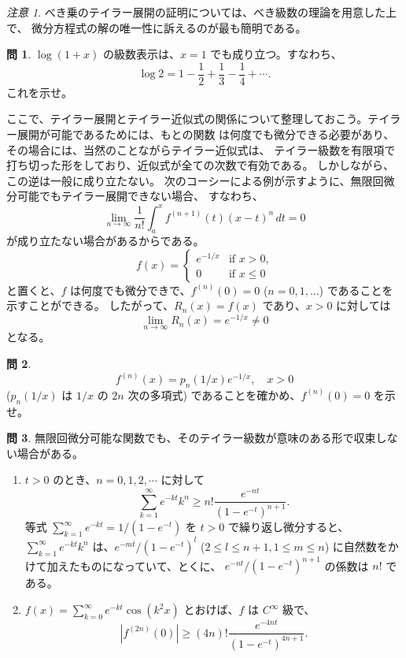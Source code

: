 \documentclass[a4paper]{jsarticle}
\theoremstyle{definition}
\newtheorem{Exercise}{問}%
\theoremstyle{remark}
\newtheorem{Remark}{注意}
\begin{document}
\begin{Remark}
{\small
べき乗のテイラー展開の証明については、べき級数の理論を用意した上で、
微分方程式の解の唯一性に訴えるのが最も簡明である。}
\end{Remark}

\begin{Exercise} $\log(1+x)$ の級数表示は、$x=1$ でも成り立つ。すなわち、
\[ 
\log 2 = 1 - \frac{1}{2} + \frac{1}{3} - \frac{1}{4} + \cdots.  
\]
これを示せ。
\end{Exercise} 

ここで、テイラー展開とテイラー近似式の関係について整理しておこう。テイラー展開が可能であるためには、もとの関数
は何度でも微分できる必要があり、その場合には、当然のことながらテイラー近似式は、
テイラー級数を有限項で打ち切った形をしており、近似式が全ての次数で有効である。
しかしながら、この逆は一般に成り立たない。
次のコーシーによる例が示すように、無限回微分可能でもテイラー展開できない場合、
すなわち、
\[
\lim_{n \to \infty} \frac{1}{n!} \int_a^x f^{(n+1)}(t) (x-t)^n\, dt = 0
\]
が成り立たない場合があるからである。
\[
f(x) = 
\begin{cases}
e^{-1/x} &\text{if $x > 0$,}\\
0 &\text{if $x \leq 0$}
\end{cases}
\]
と置くと、$f$ は何度でも微分できで、$f^{(n)}(0) = 0$ ($n=0,1, \dots$) 
であることを示すことができる。
したがって、$R_n(x) = f(x)$ であり、$x>0$ に対しては
\[
\lim_{n \to \infty} R_n(x) = e^{-1/x} \not= 0 
\]
となる。

\begin{Exercise}
\[
f^{(n)}(x) = p_n(1/x) e^{-1/x}, 
\quad x>0
\]
($p_n(1/x)$ は $1/x$ の $2n$ 次の多項式) であることを確かめ、$f^{(n)}(0) = 0$ を示せ。
\end{Exercise}

\begin{Exercise}
  無限回微分可能な関数でも、そのテイラー級数が意味のある形で収束しない場合がある。
  \begin{enumerate}
  \item $t>0$ のとき、$n=0,1,2,\cdots$ に対して
\[
\sum_{k=1}^\infty e^{-kt} k^n \geq n! \frac{e^{-nt}}{(1-e^{-t})^{n+1}}.
\]
等式 $\sum_{k=1}^\infty e^{-kt} = 1/(1-e^{-t})$ を $t>0$ で繰り返し微分すると、
$\sum_{k=1}^\infty e^{-kt} k^n$ は、$e^{-mt}/(1-e^{-t})^l$ ($2 \leq l \leq n+1, 1 \leq m \leq n$) に自然数をかけて加えたものになっていて、とくに、
$e^{-nt}/(1-e^{-t})^{n+1}$ の係数は $n!$ である。
\item 
$f(x) = \sum_{k=0}^\infty e^{-kt} \cos (k^2 x)$ とおけば、$f$ は $C^\infty$ 級で、
\[
|f^{(2n)}(0)| \geq (4n)! \frac{e^{-4nt}}{(1-e^{-t})^{4n+1}}. 
\]
  \end{enumerate}
\end{Exercise}
\end{document}
